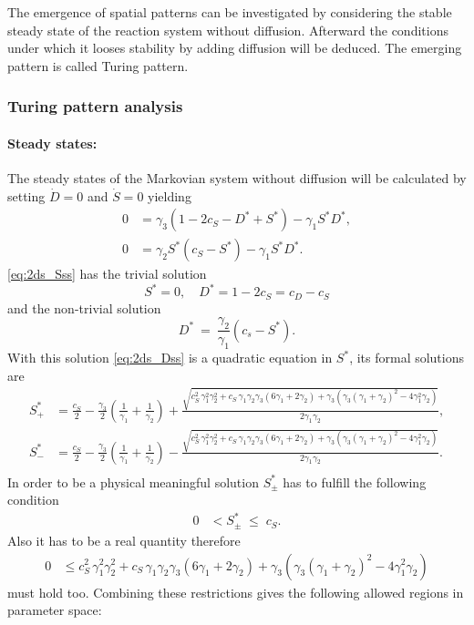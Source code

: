 The emergence of spatial patterns can be investigated by considering the stable steady state of the reaction system without diffusion.
Afterward the conditions under which it looses stability by adding diffusion will be deduced.
The emerging pattern is called Turing pattern.

\subsubsection{Turing pattern analysis}

\paragraph{Steady states:}

The steady states of the Markovian system without diffusion will be calculated by setting $\dot{D}=0$ and $\dot{S}=0$ yielding
%
\begin{align}
\label{eq:2ds_Dss} 0 &= \gamma_3\left(1-2c_S-D^*+S^*\right)-\gamma_1 S^* D^*,\\
\label{eq:2ds_Sss} 0 &= \gamma_2 S^* \left(c_S-S^*\right)-\gamma_1 S^* D^*. 
\end{align}
%
\eqref{eq:2ds_Sss} has the trivial solution 
%
\[
 S^*=0,\quad D^*=1-2c_S=c_D-c_S
\]
%
and the non-trivial solution
%
\begin{equation}
D^*~=~\frac{\gamma_2}{\gamma_1}\left(c_s-S^*\right). 
\label{eq:DssS} 
\end{equation}
%
With this solution \eqref{eq:2ds_Dss} is a quadratic equation in $S^*$, its formal solutions are
%
\begin{align}
 \nonumber S^*_+ &= \frac{c_S}{2}-\frac{\gamma_3}{2}\left(\frac{1}{\gamma_1}+\frac{1}{\gamma_2}\right)+\frac{\sqrt{c_S^2\,\gamma_1^2\gamma_2^2+c_S\,\gamma_1\gamma_2\gamma_3(6\gamma_1+2\gamma_2)+\gamma_3(\gamma_3(\gamma_1+\gamma_2)^2-4\gamma_1^2\gamma_2)}}{2\gamma_1\gamma_2},\\
 \nonumber S^*_- &= \frac{c_S}{2}-\frac{\gamma_3}{2}\left(\frac{1}{\gamma_1}+\frac{1}{\gamma_2}\right)-\frac{\sqrt{c_S^2\,\gamma_1^2\gamma_2^2+c_S\,\gamma_1\gamma_2\gamma_3(6\gamma_1+2\gamma_2)+\gamma_3(\gamma_3(\gamma_1+\gamma_2)^2-4\gamma_1^2\gamma_2)}}{2\gamma_1\gamma_2}.\\
 & \label{eq:Sss}
\end{align}
%
In order to be a physical meaningful solution $S^*_\pm$ has to fulfill the following condition
%
\begin{align*}
 0 &< S^*_\pm\; \leq\;c_S.
\end{align*}
%
Also it has to be a real quantity therefore
%
\begin{align*}
 0 &\leq c_S^2\,\gamma_1^2\gamma_2^2+c_S\,\gamma_1\gamma_2\gamma_3(6\gamma_1+2\gamma_2)+\gamma_3(\gamma_3(\gamma_1+\gamma_2)^2-4\gamma_1^2\gamma_2)
\end{align*}
%
must hold too. Combining these restrictions gives the following allowed regions in parameter space:


